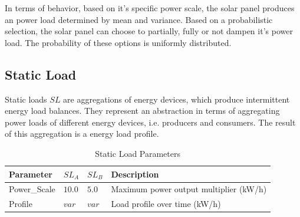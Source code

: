 




In terms of behavior, based on it's specific power scale, the solar panel produces an power load determined by mean and variance. Based on a probabilistic selection, the solar panel can choose to partially, fully or not dampen it's power load. The probability of these options is uniformly distributed.

\subsection{Static Load}
Static loads $SL$ are aggregations of energy devices, which produce intermittent energy load balances. They represent an abstraction in terms of aggregating power loads of different energy devices, i.e. producers and consumers. The result of this aggregation is a energy load profile.

\begin{table}[h]
	\renewcommand{\arraystretch}{1.3}
	\caption{Static Load Parameters}
	\centering
	\begin{tabular}{llll}
		\hline
		\textbf{Parameter}              & \textbf{$SL_{A}$}  & \textbf{$SL_{B}$}   & \textbf{Description} \\ \hline
		Power\_Scale                   	  & $10.0$ & $5.0$ & Maximum power output multiplier (kW/h) \\
		Profile                       	  	   & $var$ & $var$ & Load profile over time  (kW/h)\\ \hline
	\end{tabular}
\end{table}



